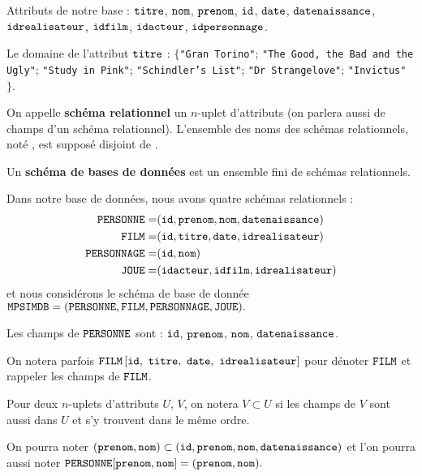 \begin{exemple}
  Attributs de notre base : $\mathtt{titre}$, $\mathtt{nom}$,
$\mathtt{prenom}$, $\mathtt{id}$,
$\mathtt{date}$, $\mathtt{datenaissance}$, $\mathtt{idrealisateur}$, $\mathtt{idfilm}$, $\mathtt{idacteur}$, $\mathtt{idpersonnage}$. 

Le domaine de l'attribut $\mathtt{titre}$ : $\{$\texttt{"Gran Torino"}; \texttt{"The Good, the Bad and the Ugly"}; \texttt{"Study in Pink"}; \texttt{"Schindler's List"}; \texttt{"Dr Strangelove"}; \texttt{"Invictus"} $\}$. 
\end{exemple}


\begin{defi}[Schémas]
  On appelle \textbf{schéma relationnel} un $n$-uplet d'attributs (on parlera aussi de champs d'un schéma relationnel). L'ensemble des noms des schémas relationnels, noté \relname, est supposé disjoint de \att. 
  
  Un \textbf{schéma de bases de données} est un ensemble fini de schémas relationnels.
\end{defi}


\begin{exemple}
  Dans notre base de données, nous avons quatre schémas relationnels : 
  \begin{align*}
    \mathtt{PERSONNE} = & (\mathtt{id},\mathtt{prenom},\mathtt{nom},\mathtt{datenaissance}) \\
    \mathtt{FILM} = & (\mathtt{id},\mathtt{titre},\mathtt{date},\mathtt{idrealisateur}) \\
    \mathtt{PERSONNAGE} = & (\mathtt{id},\mathtt{nom}) \\
    \mathtt{JOUE} = & (\mathtt{idacteur}, \mathtt{idfilm}, \mathtt{idrealisateur})
  \end{align*}
  et nous considérons le schéma de base de donnée 
$    \texttt{MPSIMDB} = (\mathtt{PERSONNE},\mathtt{FILM},\mathtt{PERSONNAGE},\mathtt{JOUE}).$

  Les champs de $\mathtt{PERSONNE}$ sont : $\mathtt{id}$, $\mathtt{prenom}$, $\mathtt{nom}$, $\mathtt{datenaissance}$.
\end{exemple}





On notera parfois $\FILM\,[\ttid,\ \tttitre,\ \ttdate,\ \ttidr]$ pour dénoter $\mathtt{FILM}$
et rappeler les champs de $\mathtt{FILM}$.

Pour deux $n$-uplets d'attributs $U$, $V$, on notera $V \subset U$ si les champs de $V$ sont aussi dans $U$ et s'y trouvent dans le même ordre. 
\begin{exemple}
  On pourra noter $    (\mathtt{prenom},\mathtt{nom}) \subset (\mathtt{id},\mathtt{prenom},\mathtt{nom},\mathtt{datenaissance}) $
  et l'on pourra aussi noter $
    \mathtt{PERSONNE}[\mathtt{prenom},\mathtt{nom}] = (\mathtt{prenom},\mathtt{nom}).$
\end{exemple}


